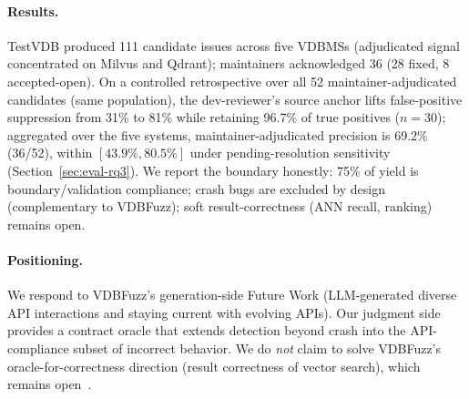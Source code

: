 \documentclass[sigconf]{acmart}
\begin{document}
\paragraph{Results.}
TestVDB produced 111 candidate issues across five VDBMSs (adjudicated signal concentrated on Milvus and Qdrant); maintainers acknowledged 36 (28 fixed, 8 accepted-open). On a controlled retrospective over all 52 maintainer-adjudicated candidates (same population), the dev-reviewer's source anchor lifts false-positive suppression from 31\% to 81\% while retaining 96.7\% of true positives ($n{=}30$); aggregated over the five systems, maintainer-adjudicated precision is 69.2\% (36/52), within $[43.9\%, 80.5\%]$ under pending-resolution sensitivity (Section~\ref{sec:eval-rq3}). We report the boundary honestly: 75\% of yield is boundary/validation compliance; crash bugs are excluded by design (complementary to VDBFuzz); soft result-correctness (ANN recall, ranking) remains open.

\paragraph{Positioning.}
We respond to VDBFuzz's generation-side Future Work (LLM-generated diverse API interactions and staying current with evolving APIs). Our judgment side provides a contract oracle that extends detection beyond crash into the API-compliance subset of incorrect behavior. We do \emph{not} claim to solve VDBFuzz's oracle-for-correctness direction (result correctness of vector search), which remains open~\cite{roadmap25}.
\end{document}
